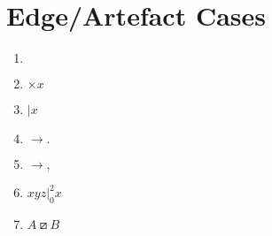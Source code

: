 \documentclass{article}
\begin{document}
\section{Edge/Artefact Cases}
\begin{enumerate}
  \item $\,$  %
  \item $\times x$ %
  \item $\mathbin{|} x$ %
  \item $\rightarrow.$
  \item $\rightarrow,$
  \item $\left. xyz \right|_0^2 x$
  \item $ A \boxslash B $
\end{enumerate}
\end{document}
